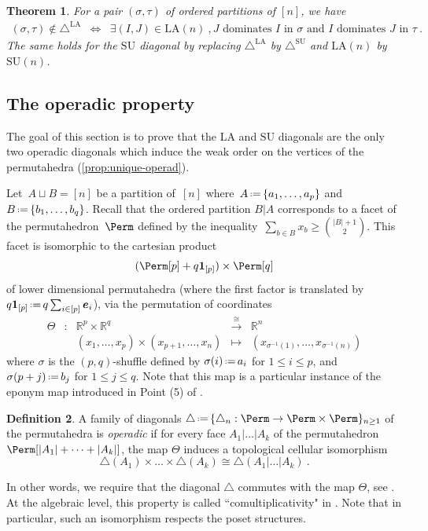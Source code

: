\documentclass{amsart}
\newcommand{\darkblue}{\color{darkblue}} %
\newtheorem{theorem}{Theorem}[section]
\theoremstyle{definition}
\newtheorem{definition}[theorem]{Definition}
\newcommand{\R}{\mathbb{R}} %
\renewcommand{\b}[1]{{\boldsymbol{#1}}} %
\newcommand{\one}{\b{1}} %
\newcommand{\eqdef}{\mbox{\,\raisebox{0.2ex}{\scriptsize\ensuremath{\mathrm:}}\ensuremath{=}\,}} %
\newcommand{\defn}[1]{\textsl{\darkblue #1}} %
\renewcommand{\b}[1]{\boldsymbol{#1}} %
\newcommand{\SU}{\mathrm{SU}}
\newcommand{\LA}{\mathrm{LA}}
\newcommand{\SUD}{\triangle^{\mathrm{SU}}}
\newcommand{\LAD}{\triangle^{\mathrm{LA}}}
\begin{document}
\begin{theorem}
\label{thm:minimal}
For a pair $(\sigma,\tau)$ of ordered partitions of $[n]$, we have
\begin{eqnarray*}
(\sigma,\tau)\notin \LAD 
& \iff & \exists (I,J) \in \LA(n) \ , J \text{ dominates } I \text{ in } \sigma \text{ and } I \text{ dominates } J \text{ in } \tau \ .
\end{eqnarray*}
The same holds for the $\SU$ diagonal by replacing $\LAD$ by $\SUD$ and $\LA(n)$ by $\SU(n)$.
\end{theorem}


\subsection{The operadic property}
\label{subsec:operadicProperty}

The goal of this section is to prove that the $\LA$ and $\SU$ diagonals are the only two operadic diagonals which induce the weak order on the vertices of the permutahedra (\cref{prop:unique-operad}). 

Let~$A \sqcup B = [n]$ be a partition of~$[n]$ where~$A \eqdef \{a_1,\dots,a_p\}$ and~$B \eqdef \{b_1,\dots,b_q\}$.
Recall that the ordered partition $B | A$ corresponds to a facet of the permutahedron~$\Perm$ defined by the inequality~$\sum_{b \in B} x_b \ge \binom{|B|+1}{2}$.
This facet is isomorphic to the cartesian product
\[
(\Perm[p] +q \one_{[p]}) \times \Perm[q]
\]
of lower dimensional permutahedra (where the first factor is translated by~$q \one_{[p]} \eqdef q \sum_{i \in [p]} \b{e}_i$), via the permutation of coordinates
\begin{equation*}
	\begin{matrix}
		\Theta & : & \R^{p} \times \R^{q} & \overset{\cong}{\longrightarrow} & \R^{n} \\
		 & & (x_1,\ldots,x_p) \times (x_{p+1}, \ldots, x_{n})  & \longmapsto & (x_{\sigma^{-1}(1)},\ldots,x_{\sigma^{-1}(n)})
	\end{matrix}
\end{equation*}
where $\sigma$ is the $(p,q)$-shuffle defined by $\sigma(i) \eqdef a_i$ for $1 \leq i \leq p$, and $\sigma(p+j)\eqdef b_j$ for $1 \leq j \leq q$.
Note that this map is a particular instance of the eponym map introduced in Point (5) of \cite[Prop. 2.3]{LaplanteAnfossi}.

\begin{definition}
\label{def:operadicDiagonal}
A family of diagonals $\triangle \eqdef \{\triangle_n : \Perm \to \Perm \times \Perm\}_{n\geq 1}$ of the permutahedra is \defn{operadic} if for every face $A_1 | \ldots | A_k$ of the permutahedron $\Perm[|A_1|+\cdots + |A_k|]$, the map $\Theta$ induces a topological cellular isomorphism \[  \triangle(A_1) \times \ldots \times \triangle(A_k) \cong \triangle(A_1 | \ldots | A_k) \ . \]
\end{definition}
In other words, we require that the diagonal $\triangle$ commutes with the map $\Theta$, see \cite[Section 4.2]{LaplanteAnfossi}.
At the algebraic level, this property is called ``comultiplicativity" in \cite{SaneblidzeUmble}.
Note that in particular, such an isomorphism respects the poset structures. 
\end{document}
